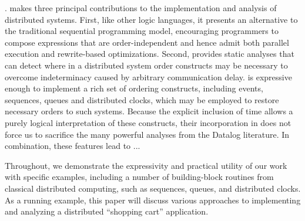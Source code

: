 .
\lang makes three principal contributions to the implementation and analysis
of distributed systems.  First, like other logic languages, it presents an
alternative to the traditional sequential programming model,  encouraging
programmers to compose expressions that are order-independent and hence admit
both parallel execution and rewrite-based optimizations.
Second, \lang provides static analyses that can detect where in a distributed system
order constructs may be necessary to overcome indeterminacy caused by arbitrary
communication delay.  \lang is expressive enough to implement a rich set of ordering
constructs, including events, sequences, queues
and distributed clocks,
which may be employed to restore necessary orders to such systems.
Because the explicit inclusion of time allows a purely logical interpretation of 
these constructs, their incorporation in \lang does not force us to sacrifice 
the many powerful analyses from the Datalog literature.
In combination, these features lead to ... 

Throughout, we demonstrate the expressivity
and practical utility of our work with specific examples, including a
number of building-block routines from classical distributed
computing, such as sequences, queues, and distributed clocks.  
As a running example, this paper will discuss various approaches to 
implementing and analyzing a distributed ``shopping cart'' application.

